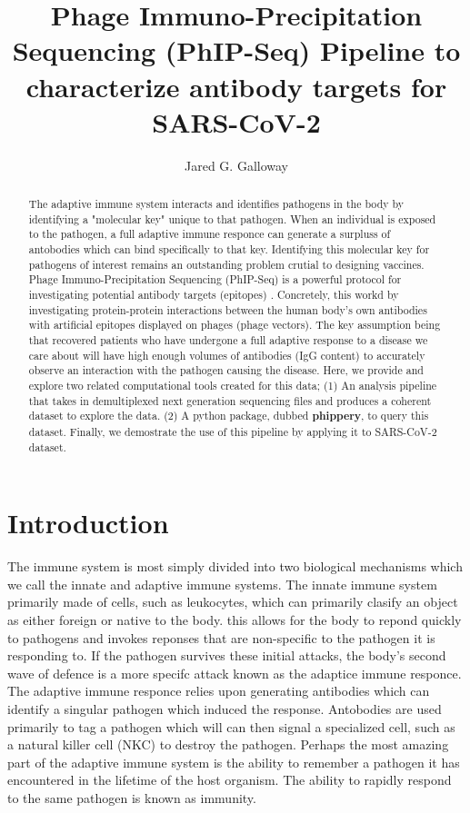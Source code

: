 \documentclass{article}
\title{Phage Immuno-Precipitation Sequencing (PhIP-Seq) Pipeline to characterize antibody targets for SARS-CoV-2}
\author{Jared G. Galloway}
\begin{document}
\maketitle

\begin{abstract}
The adaptive immune system interacts and identifies pathogens in the body by identifying a "molecular key" unique to that pathogen.
When an individual is exposed to the pathogen, a full adaptive immune responce can generate a surpluss of antobodies which can bind specifically to that key.
Identifying this molecular key for pathogens of interest remains an outstanding problem crutial to designing vaccines. 
Phage Immuno-Precipitation Sequencing (PhIP-Seq) is a powerful protocol for investigating potential antibody targets (epitopes) \cite{Larman2011}. 
Concretely, this workd by investigating protein-protein interactions between the human body's own antibodies with artificial epitopes displayed on phages (phage vectors).
The key assumption being that recovered patients who have undergone 
a full adaptive response to a disease we care about will have high enough volumes of antibodies (IgG content) to accurately observe an interaction with the pathogen causing the disease. 
Here, we provide and explore two related computational tools created for this data;
(1) An analysis pipeline that takes in demultiplexed next generation sequencing files and produces a coherent dataset to explore the data.
(2) A python package, dubbed \textbf{phippery}, to query this dataset.
Finally, we demostrate the use of this pipeline by applying it to SARS-CoV-2 dataset.
\end{abstract}

\section*{Introduction}

The immune system is most simply divided into two biological mechanisms which we call the innate and adaptive immune systems.
The innate immune system primarily made of cells, such as leukocytes, which can primarily clasify an object as either foreign or native to the body.
this allows for the body to repond quickly to pathogens and invokes reponses that are non-specific to the pathogen it is responding to.
If the pathogen survives these initial attacks, the body's second wave of defence is a more specifc attack known as the adaptice immune responce.
The adaptive immune responce relies upon generating antibodies which can identify a singular pathogen which induced the response. 
Antobodies are used primarily to tag a pathogen which will can then signal a specialized cell, such as a natural killer cell (NKC) to destroy the pathogen. 
Perhaps the most amazing part of the adaptive immune system is the ability to remember a pathogen it has encountered in the lifetime of the host organism.
The ability to rapidly respond to the same pathogen is known as immunity.
 
\end{document}
